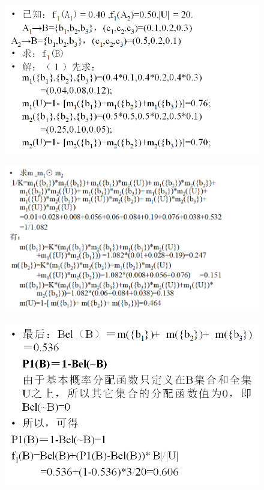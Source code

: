 \documentclass[UTF8,a4paper]{ctexart}
\begin{document}
\begin{figure}[H]
	\centering
	\includegraphics[scale = 0.5]{assets/ArtificialIntelligence/2018-01-09-00-47-51.png}
\end{figure}
\begin{figure}[H]
	\centering
	\includegraphics[scale = 0.5]{assets/ArtificialIntelligence/2018-01-09-00-48-11.png}
\end{figure}
\begin{figure}[H]
	\centering
	\includegraphics[scale = 0.5]{assets/ArtificialIntelligence/2018-01-09-00-48-30.png}
\end{figure}
\end{document}
